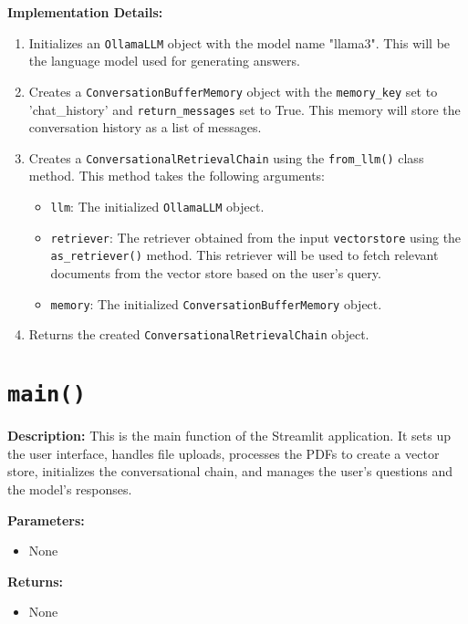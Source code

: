 \documentclass{article}
\begin{document}
\textbf{Implementation Details:}
\begin{enumerate}
    \item Initializes an \texttt{OllamaLLM} object with the model name "llama3". This will be the language model used for generating answers.
    \item Creates a \texttt{ConversationBufferMemory} object with the \texttt{memory\_key} set to 'chat\_history' and \texttt{return\_messages} set to True. This memory will store the conversation history as a list of messages.
    \item Creates a \texttt{ConversationalRetrievalChain} using the \texttt{from\_llm()} class method. This method takes the following arguments:
    \begin{itemize}
        \item \texttt{llm}: The initialized \texttt{OllamaLLM} object.
        \item \texttt{retriever}: The retriever obtained from the input \texttt{vectorstore} using the \texttt{as\_retriever()} method. This retriever will be used to fetch relevant documents from the vector store based on the user's query.
        \item \texttt{memory}: The initialized \texttt{ConversationBufferMemory} object.
    \end{itemize}
    \item Returns the created \texttt{ConversationalRetrievalChain} object.
\end{enumerate}

\section*{\texttt{main()}}

\textbf{Description:} This is the main function of the Streamlit application. It sets up the user interface, handles file uploads, processes the PDFs to create a vector store, initializes the conversational chain, and manages the user's questions and the model's responses.

\textbf{Parameters:}
\begin{itemize}
    \item None
\end{itemize}

\textbf{Returns:}
\begin{itemize}
    \item None
\end{itemize}
\end{document}

